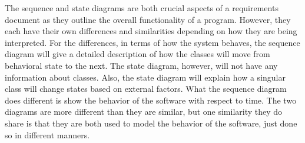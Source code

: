 		The sequence and state diagrams are both crucial aspects of a requirements document as they outline the overall functionality of a program. However, they each have their own differences and similarities depending on how they are being interpreted. For the differences, in terms of how the system behaves, the sequence diagram will give a detailed description of how the classes will move from behavioral state to the next. The state diagram, however, will not have any information about classes. Also, the state diagram will explain how a singular class will change states based on external factors. What the sequence diagram does different is show the behavior of the software with respect to time. The two diagrams are more different than they are similar, but one similarity they do share is that they are both used to model the behavior of the software, just done so in different manners.

